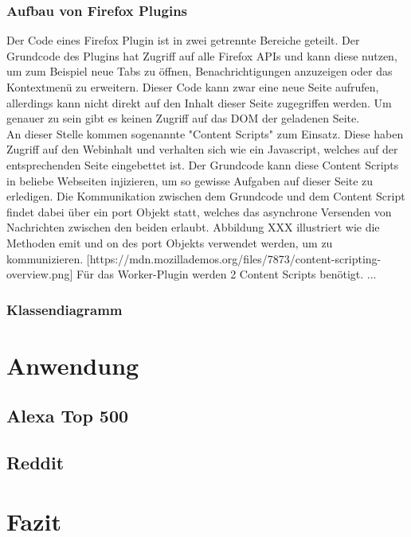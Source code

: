 \subsection{Aufbau von Firefox Plugins}
Der Code eines Firefox Plugin ist in zwei getrennte Bereiche geteilt. Der Grundcode des Plugins hat Zugriff auf alle Firefox APIs und kann diese nutzen, um zum Beispiel neue Tabs zu öffnen, Benachrichtigungen anzuzeigen oder das Kontextmenü zu erweitern. Dieser Code kann zwar eine neue Seite aufrufen, allerdings kann nicht direkt auf den Inhalt dieser Seite zugegriffen werden. Um genauer zu sein gibt es keinen Zugriff auf das DOM der geladenen Seite. \\
An dieser Stelle kommen sogenannte "Content Scripts" zum Einsatz. Diese haben Zugriff auf den Webinhalt und verhalten sich wie ein Javascript, welches auf der entsprechenden Seite eingebettet ist. Der Grundcode kann diese Content Scripts in beliebe Webseiten injizieren, um so gewisse Aufgaben auf dieser Seite zu erledigen. Die Kommunikation zwischen dem Grundcode und dem Content Script findet dabei über ein port Objekt statt, welches das asynchrone Versenden von Nachrichten zwischen den beiden erlaubt. Abbildung XXX illustriert wie die Methoden emit und on des port Objekts verwendet werden, um zu kommunizieren. [https://mdn.mozillademos.org/files/7873/content-scripting-overview.png]
Für das Worker-Plugin werden 2 Content Scripts benötigt. ...
\subsection{Klassendiagramm}
\chapter{Anwendung}
\section{Alexa Top 500}
\section{Reddit}

\chapter{Fazit}
